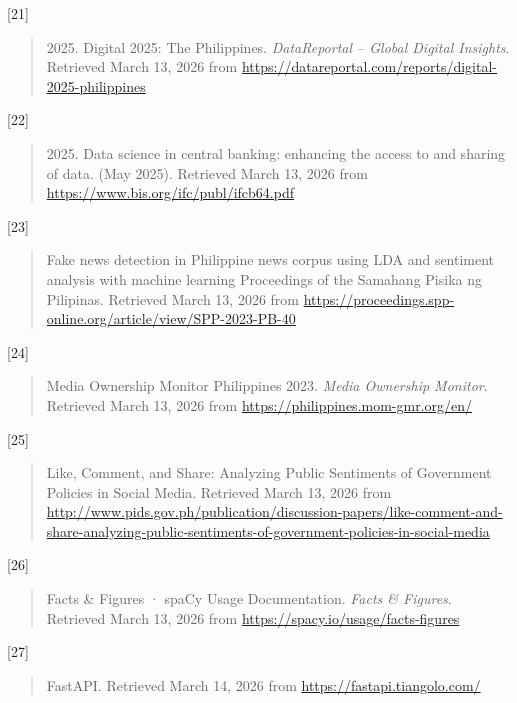 {[}21{]}

\begin{quote}
2025. Digital 2025: The Philippines. \emph{DataReportal -- Global Digital Insights}. Retrieved March 13, 2026 from \url{https://datareportal.com/reports/digital-2025-philippines}
\end{quote}

{[}22{]}

\begin{quote}
2025. Data science in central banking: enhancing the access to and sharing of data. (May 2025). Retrieved March 13, 2026 from \url{https://www.bis.org/ifc/publ/ifcb64.pdf}
\end{quote}

{[}23{]}

\begin{quote}
Fake news detection in Philippine news corpus using LDA and sentiment analysis with machine learning \textbar{} Proceedings of the Samahang Pisika ng Pilipinas. Retrieved March 13, 2026 from \url{https://proceedings.spp-online.org/article/view/SPP-2023-PB-40}
\end{quote}

{[}24{]}

\begin{quote}
Media Ownership Monitor Philippines 2023. \emph{Media Ownership Monitor}. Retrieved March 13, 2026 from \url{https://philippines.mom-gmr.org/en/}
\end{quote}

{[}25{]}

\begin{quote}
Like, Comment, and Share: Analyzing Public Sentiments of Government Policies in Social Media. Retrieved March 13, 2026 from \url{http://www.pids.gov.ph/publication/discussion-papers/like-comment-and-share-analyzing-public-sentiments-of-government-policies-in-social-media}
\end{quote}

{[}26{]}

\begin{quote}
Facts \& Figures · spaCy Usage Documentation. \emph{Facts \& Figures}. Retrieved March 13, 2026 from \url{https://spacy.io/usage/facts-figures}
\end{quote}

{[}27{]}

\begin{quote}
FastAPI. Retrieved March 14, 2026 from \url{https://fastapi.tiangolo.com/}
\end{quote}

